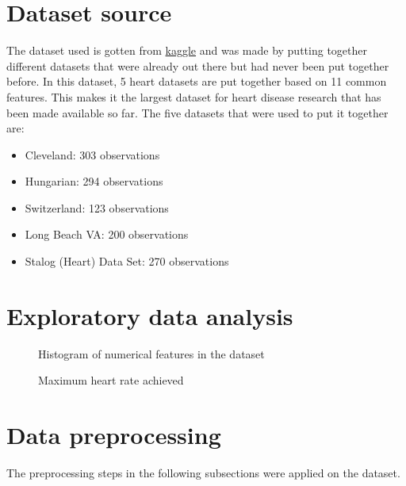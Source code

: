 
\section{Dataset source}
The dataset used is gotten from \href{https://www.kaggle.com/datasets/fedesoriano/heart-failure-prediction}{kaggle} and was made by putting together different datasets that were already out there but had never been put together before. In this dataset, 5 heart datasets are put together based on 11 common features. This makes it the largest dataset for heart disease research that has been made available so far. The five datasets that were used to put it together are:
\begin{itemize}
	\item Cleveland: 303 observations
	\item Hungarian: 294 observations
	\item Switzerland: 123 observations
	\item Long Beach VA: 200 observations
	\item Stalog (Heart) Data Set: 270 observations
\end{itemize}


\section{Exploratory data analysis}
\begin{figure}[htb]
	\centering
	\caption{Histogram of numerical features in the dataset}
	\label{fig:df-histogram}
\end{figure}

\begin{figure}[htb]
	\centering
	\caption{Maximum heart rate achieved}
	\label{fig:max-heart-rate}
\end{figure}

\section{Data preprocessing}
The preprocessing steps in the following subsections were applied on the dataset.
